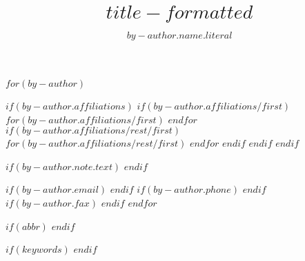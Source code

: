 $for(by-author)$
\author{$by-author.name.literal$}
$if(by-author.affiliations)$
$if(by-author.affiliations/first)$
$for(by-author.affiliations/first)$
$endfor$
$if(by-author.affiliations/rest/first)$
$for(by-author.affiliations/rest/first)$
$endfor$
$endif$
$endif$
$endif$

$if(by-author.note.text)$
$endif$

$if(by-author.email)$
$endif$
$if(by-author.phone)$
$endif$
$if(by-author.fax)$
$endif$
$endfor$

$if(abbr)$
$endif$

$if(keywords)$
$endif$

\title[$title-short$]{$title-formatted$}
\makeatletter